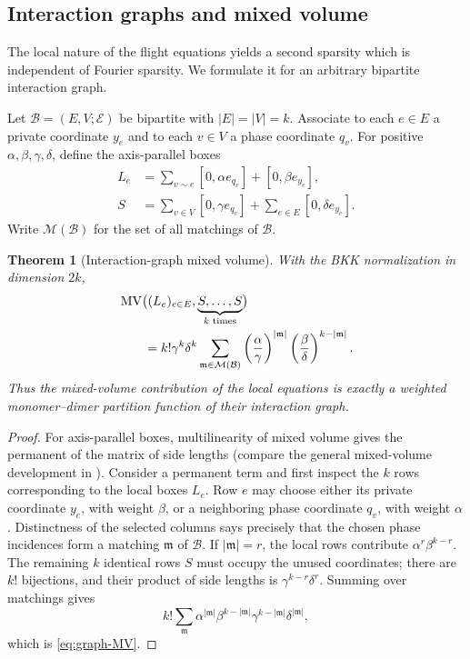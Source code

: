 \documentclass[11pt]{article}
\newtheorem{theorem}{Theorem}[section]
\newcommand{\MV}{\operatorname{MV}}
\begin{document}
\subsection{Interaction graphs and mixed volume}

The local nature of the flight equations yields a second sparsity which is independent of Fourier sparsity.  We formulate it for an arbitrary bipartite interaction graph.

Let $\mathcal B=(E,V;\mathcal E)$ be bipartite with $|E|=|V|=k$.  Associate to each $e\in E$ a private coordinate $y_e$ and to each $v\in V$ a phase coordinate $q_v$.  For positive $\alpha,\beta,\gamma,\delta$, define the axis-parallel boxes
\begin{align}
 L_e&=\sum_{v\sim e}[0,\alpha e_{q_v}]+[0,\beta e_{y_e}],\label{eq:local-box}\\
 S&=\sum_{v\in V}[0,\gamma e_{q_v}]
   +\sum_{e\in E}[0,\delta e_{y_e}].\label{eq:global-box}
\end{align}
Write $\mathcal M(\mathcal B)$ for the set of all matchings of $\mathcal B$.

\begin{theorem}[Interaction-graph mixed volume]\label{thm:graph-mixed-volume}
With the BKK normalization in dimension $2k$,
\begin{align}
 &\MV\bigl((L_e)_{e\in E},\underbrace{S,\ldots,S}_{k\text{ times}}\bigr)\notag\\
 &\qquad =k!\gamma^k\delta^k
 \sum_{\mathfrak m\in\mathcal M(\mathcal B)}
 \left(\frac{\alpha}{\gamma}\right)^{|\mathfrak m|}
 \left(\frac{\beta}{\delta}\right)^{k-|\mathfrak m|}.
 \label{eq:graph-MV}
\end{align}
Thus the mixed-volume contribution of the local equations is exactly a weighted monomer--dimer partition function of their interaction graph.
\end{theorem}

\begin{proof}
For axis-parallel boxes, multilinearity of mixed volume gives the permanent of the matrix of side lengths (compare the general mixed-volume development in \cite[Chapter~5]{Schneider2014}).  Consider a permanent term and first inspect the $k$ rows corresponding to the local boxes $L_e$.  Row $e$ may choose either its private coordinate $y_e$, with weight $\beta$, or a neighboring phase coordinate $q_v$, with weight $\alpha$.  Distinctness of the selected columns says precisely that the chosen phase incidences form a matching $\mathfrak m$ of $\mathcal B$.  If $|\mathfrak m|=r$, the local rows contribute $\alpha^r\beta^{k-r}$.  The remaining $k$ identical rows $S$ must occupy the unused coordinates; there are $k!$ bijections, and their product of side lengths is $\gamma^{k-r}\delta^r$.  Summing over matchings gives
\[
 k!\sum_{\mathfrak m}
 \alpha^{|\mathfrak m|}\beta^{k-|\mathfrak m|}
 \gamma^{k-|\mathfrak m|}\delta^{|\mathfrak m|},
\]
which is \eqref{eq:graph-MV}.
\end{proof}
\end{document}
